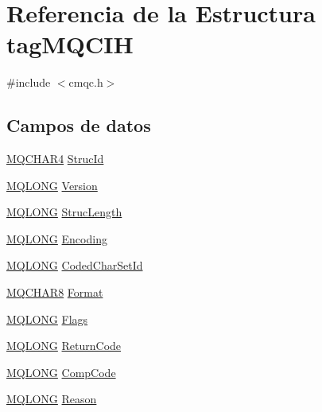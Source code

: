 \hypertarget{structtag_m_q_c_i_h}{}\section{Referencia de la Estructura tag\+M\+Q\+C\+I\+H}
\label{structtag_m_q_c_i_h}


{\ttfamily \#include $<$cmqc.\+h$>$}

\subsection*{Campos de datos}
\begin{DoxyCompactItemize}
\item 
\hyperlink{cmqc_8h_a12590e546ed66fda7cf21c1d5cefa31d}{M\+Q\+C\+H\+A\+R4} \hyperlink{structtag_m_q_c_i_h_a0530922ca944569b52601d74941f96e4}{Struc\+Id}
\item 
\hyperlink{cmqc_8h_a1fb8d28cbda3fa8766a9821230cdb6d5}{M\+Q\+L\+O\+N\+G} \hyperlink{structtag_m_q_c_i_h_a0656ef8f766b3907d394d88a35d7b7e9}{Version}
\item 
\hyperlink{cmqc_8h_a1fb8d28cbda3fa8766a9821230cdb6d5}{M\+Q\+L\+O\+N\+G} \hyperlink{structtag_m_q_c_i_h_a830af9a4a08c015b9a4b2d39d4d3420a}{Struc\+Length}
\item 
\hyperlink{cmqc_8h_a1fb8d28cbda3fa8766a9821230cdb6d5}{M\+Q\+L\+O\+N\+G} \hyperlink{structtag_m_q_c_i_h_a30167bf454a49a60fd3fe4e9e586af34}{Encoding}
\item 
\hyperlink{cmqc_8h_a1fb8d28cbda3fa8766a9821230cdb6d5}{M\+Q\+L\+O\+N\+G} \hyperlink{structtag_m_q_c_i_h_a4d8d1961a991850d1355cdf9b4680b8e}{Coded\+Char\+Set\+Id}
\item 
\hyperlink{cmqc_8h_abddcedb8c41fa262f2bd05dfec3e60a5}{M\+Q\+C\+H\+A\+R8} \hyperlink{structtag_m_q_c_i_h_a435a478822008713f8aaff89f369ed63}{Format}
\item 
\hyperlink{cmqc_8h_a1fb8d28cbda3fa8766a9821230cdb6d5}{M\+Q\+L\+O\+N\+G} \hyperlink{structtag_m_q_c_i_h_a8da770267273b200fa9c968fa2a0da57}{Flags}
\item 
\hyperlink{cmqc_8h_a1fb8d28cbda3fa8766a9821230cdb6d5}{M\+Q\+L\+O\+N\+G} \hyperlink{structtag_m_q_c_i_h_ae571e9fa07717fe4448546095367c458}{Return\+Code}
\item 
\hyperlink{cmqc_8h_a1fb8d28cbda3fa8766a9821230cdb6d5}{M\+Q\+L\+O\+N\+G} \hyperlink{structtag_m_q_c_i_h_a3d53860a50c3834d3dad9f5b2e5b5234}{Comp\+Code}
\item 
\hyperlink{cmqc_8h_a1fb8d28cbda3fa8766a9821230cdb6d5}{M\+Q\+L\+O\+N\+G} \hyperlink{structtag_m_q_c_i_h_ac2f0378cb0c66c5f91625822e53d7bae}{Reason}

\end{DoxyCompactItemize}
